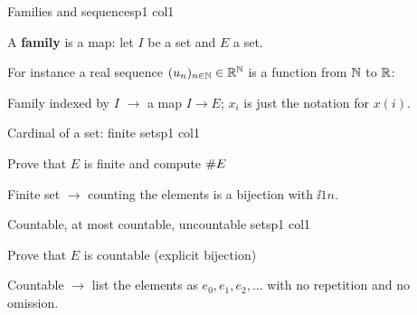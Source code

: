 \documentclass[sheet,noautoquant,noautokw]{neyvia-study}
\begin{document}
\begin{concept}[1.7]{Families and sequences}{p1 col1}
\begin{definition}
\noindent A \textbf{family} is a map: let $I$ be a set and $E$ a set.
\par\noindent For instance a real sequence $(u_n)_{n\in\mathbb{N}}\in\mathbb{R}^{\mathbb{N}}$ is a function from $\mathbb{N}$ to $\mathbb{R}$:
\end{definition}
\begin{reflex}
Family indexed by $I$ \ensuremath{\rightarrow} a map $I\to E$; $x_i$ is just the notation for $x(i)$.
\end{reflex}
\end{concept}
\begin{concept}[1.8]{Cardinal of a set: finite sets}{p1 col1}
\begin{definition}
\end{definition}
\begin{method}{Prove that $E$ is finite and compute $\# E$}
\end{method}
\begin{reflex}
Finite set \ensuremath{\rightarrow} counting the elements is a bijection with $\ii{1}{n}$.
\end{reflex}
\end{concept}
\begin{concept}[1.9]{Countable, at most countable, uncountable sets}{p1 col1}
\begin{definition}
\end{definition}
\begin{method}{Prove that $E$ is countable (explicit bijection)}
\end{method}
\begin{reflex}
Countable \ensuremath{\rightarrow} list the elements as $e_0,e_1,e_2,\dots$ with no repetition and no omission.
\end{reflex}
\end{concept}
\end{document}
